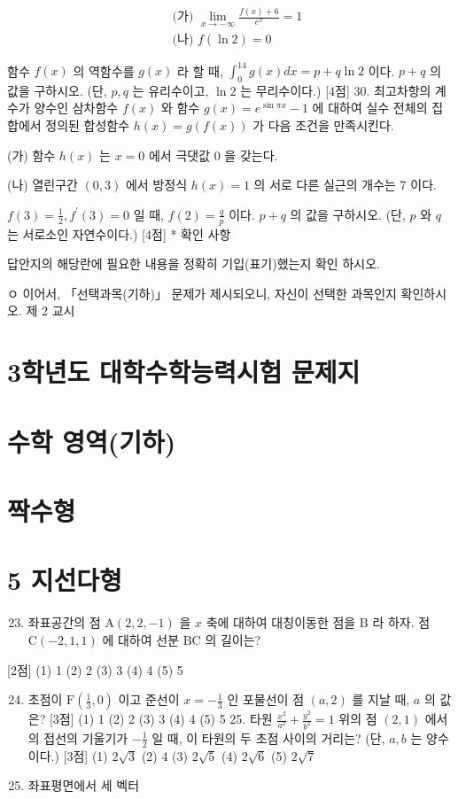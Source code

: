 \documentclass[10pt]{article}
\begin{document}
$$
\begin{aligned}
& \text { (가) } \lim _{x \rightarrow-\infty} \frac{f(x)+6}{e^{x}}=1 \\
& \text { (나) } f(\ln 2)=0
\end{aligned}
$$

함수 $f(x)$ 의 역함수를 $g(x)$ 라 할 때, $\int_{0}^{14} g(x) d x=p+q \ln 2$ 이다. $p+q$ 의 값을 구하시오. (단, $p, q$ 는 유리수이고, $\ln 2$ 는 무리수이다.) [4점] 30. 최고차항의 계수가 양수인 삼차함수 $f(x)$ 와 함수 $g(x)=e^{\sin \pi x}-1$ 에 대하여 실수 전체의 집합에서 정의된 합성함수 $h(x)=g(f(x))$ 가 다음 조건을 만족시킨다.

(가) 함수 $h(x)$ 는 $x=0$ 에서 극댓값 0 을 갖는다.

(나) 열린구간 $(0,3)$ 에서 방정식 $h(x)=1$ 의 서로 다른 실근의 개수는 7 이다.

$f(3)=\frac{1}{2}, f^{\prime}(3)=0$ 일 때, $f(2)=\frac{q}{p}$ 이다. $p+q$ 의 값을 구하시오. (단, $p$ 와 $q$ 는 서로소인 자연수이다.) [4점] * 확인 사항

답안지의 해당란에 필요한 내용을 정확히 기입(표기)했는지 확인 하시오.

ㅇ 이어서, 「선택과목(기하)」 문제가 제시되오니, 자신이 선택한 과목인지 확인하시오. 제 2 교시

\section{3학년도 대학수학능력시험 문제지}
\section{수학 영역(기하)}
\section{짝수형}
\section{5 지선다형}
\begin{enumerate}
  \setcounter{enumi}{22}
  \item 좌표공간의 점 $\mathrm{A}(2,2,-1)$ 을 $x$ 축에 대하여 대칭이동한 점을 $\mathrm{B}$ 라 하자. 점 $\mathrm{C}(-2,1,1)$ 에 대하여 선분 $\mathrm{BC}$ 의 길이는?
\end{enumerate}

[2점]
(1) 1
(2) 2
(3) 3
(4) 4
(5) 5

\begin{enumerate}
  \setcounter{enumi}{23}
  \item 초점이 $\mathrm{F}\left(\frac{1}{3}, 0\right)$ 이고 준선이 $x=-\frac{1}{3}$ 인 포물선이 점 $(a, 2)$ 를 지날 때, $a$ 의 값은? [3점]
(1) 1
(2) 2
(3) 3
(4) 4
(5) 5 25. 타원 $\frac{x^{2}}{a^{2}}+\frac{y^{2}}{b^{2}}=1$ 위의 점 $(2,1)$ 에서의 접선의 기울기가 $-\frac{1}{2}$ 일 때, 이 타원의 두 초점 사이의 거리는? (단, $a, b$ 는 양수이다.) [3점]
(1) $2 \sqrt{3}$
(2) 4
(3) $2 \sqrt{5}$
(4) $2 \sqrt{6}$
(5) $2 \sqrt{7}$

  \item 좌표평면에서 세 벡터

\end{enumerate}
\end{document}
